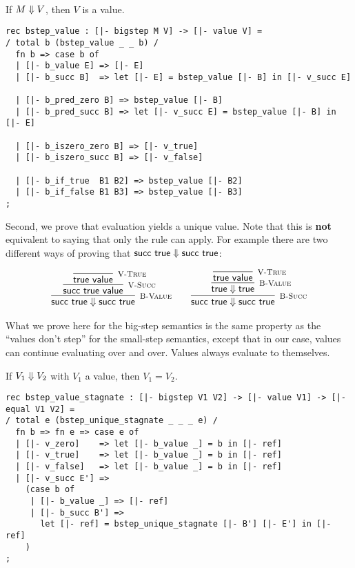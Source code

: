 \begin{lemma}
  \label{lem:bstep-value-soundness}
  ~\\If $M \Downarrow V$, then $V$ is a value.
\end{lemma}

\begin{lstlisting}
rec bstep_value : [|- bigstep M V] -> [|- value V] =
/ total b (bstep_value _ _ b) /
  fn b => case b of
  | [|- b_value E] => [|- E]
  | [|- b_succ B]  => let [|- E] = bstep_value [|- B] in [|- v_succ E]

  | [|- b_pred_zero B] => bstep_value [|- B]
  | [|- b_pred_succ B] => let [|- v_succ E] = bstep_value [|- B] in [|- E]

  | [|- b_iszero_zero B] => [|- v_true]
  | [|- b_iszero_succ B] => [|- v_false]

  | [|- b_if_true  B1 B2] => bstep_value [|- B2]
  | [|- b_if_false B1 B3] => bstep_value [|- B3]
;
\end{lstlisting}

Second, we  prove that evaluation yields a unique value. Note that
this is {\bf not} equivalent to saying that only the \BValue rule can
apply. For example there are two different ways of proving that
$\textsf{succ}~\textsf{true} \Downarrow \textsf{succ}~\textsf{true}$:

\[
\begin{array}{c@{\qquad}c}
  \infer[\BValue]{\tmsucc \tmtrue \BSteps \tmsucc \tmtrue}
  {\infer[\VSucc]{\tmsucc \tmtrue \Value}
    {\infer[\VTrue]{\tmtrue \Value}{}}} &

  \infer[\BSucc]{\tmsucc \tmtrue \BSteps \tmsucc \tmtrue}
  {\infer[\BValue]{\tmtrue \BSteps \tmtrue}
    {\infer[\VTrue]{\tmtrue \Value}{}}}
\end{array}
\]

What we prove here for the big-step semantics is the same property as the
``values don't step'' for the small-step semantics, except that in our case,
values can continue evaluating over and over. Values always
evaluate to themselves.

\begin{lemma}
  \label{lem:bstep-values-stagnate}
  If $V_1 \Downarrow V_2$ with $V_1$ a value, then $V_1 = V_2$.
\end{lemma}

\begin{lstlisting}
rec bstep_value_stagnate : [|- bigstep V1 V2] -> [|- value V1] -> [|- equal V1 V2] =
/ total e (bstep_unique_stagnate _ _ _ e) /
  fn b => fn e => case e of
  | [|- v_zero]    => let [|- b_value _] = b in [|- ref]
  | [|- v_true]    => let [|- b_value _] = b in [|- ref]
  | [|- v_false]   => let [|- b_value _] = b in [|- ref]
  | [|- v_succ E'] =>
    (case b of
     | [|- b_value _] => [|- ref]
     | [|- b_succ B'] =>
       let [|- ref] = bstep_unique_stagnate [|- B'] [|- E'] in [|- ref]
    )
;
\end{lstlisting}

